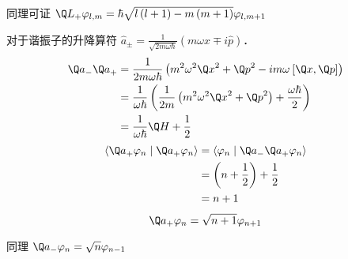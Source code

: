 同理可证 ${\Q L_ + }{\varphi_{l,m}} = \hbar \sqrt {l\left( {l + 1} \right) - m\left( {m + 1} \right)} {\varphi_{l,m + 1}}$ 


对于谐振子的升降算符 ${\hat a_ \pm } = \frac{1}{\sqrt {2m\omega \hbar } }\left( {m\omega \hat x \mp i\hat p} \right)$．   
 \begin{equation}
  \begin{aligned}
  {{\Q a}_ - }{{\Q a}_ + } &= \frac{1}{2m\omega \hbar }\left( {{m^2}{\omega ^2}{{\Q x}^2} + {{\Q p}^2} - im\omega {\kern 1pt} {\kern 1pt} [\Q x,\Q p]} \right) \hfill \\
   &= \frac{1}{\omega \hbar }\left( {\frac{1}{2m}\left( {{m^2}{\omega ^2}{{\Q x}^2} + {{\Q p}^2}} \right) + \frac{\omega \hbar }{2}} \right) \hfill \\
  & = \frac{1}{\omega \hbar }\Q H + \frac{1}{2} \hfill \\ 
\end{aligned} 
\end{equation}
 \begin{equation}
  \begin{aligned}
  \left\langle {{{\Q a}_ + }{\varphi_n}}
 \mathrel{\left | {\vphantom {{{{\Q a}_ + }{\varphi_n}} {{{\Q a}_ + }{\varphi_n}}}}
 \right. \kern-\nulldelimiterspace}
 {{{\Q a}_ + }{\varphi_n}} \right\rangle  &= \left\langle {\varphi_n}
 \mathrel{\left | {\vphantom {{\varphi_n} {{{\Q a}_ - }{{\Q a}_ + }{\varphi_n}}}}
 \right. \kern-\nulldelimiterspace}
 {{{\Q a}_ - }{{\Q a}_ + }{\varphi_n}} \right\rangle  \hfill \\
  & = \left( {n + \frac{1}{2}} \right) + \frac{1}{2} \\
  &= n + 1 \hfill \\ 
\end{aligned} 
\end{equation}
\begin{equation}
  {\Q a_ + }{\varphi_n} = \sqrt {n + 1} {\varphi_{n + 1}}
\end{equation}
 
同理 ${\Q a_ - }{\varphi_n} = \sqrt n {\varphi_{n - 1}}$   

